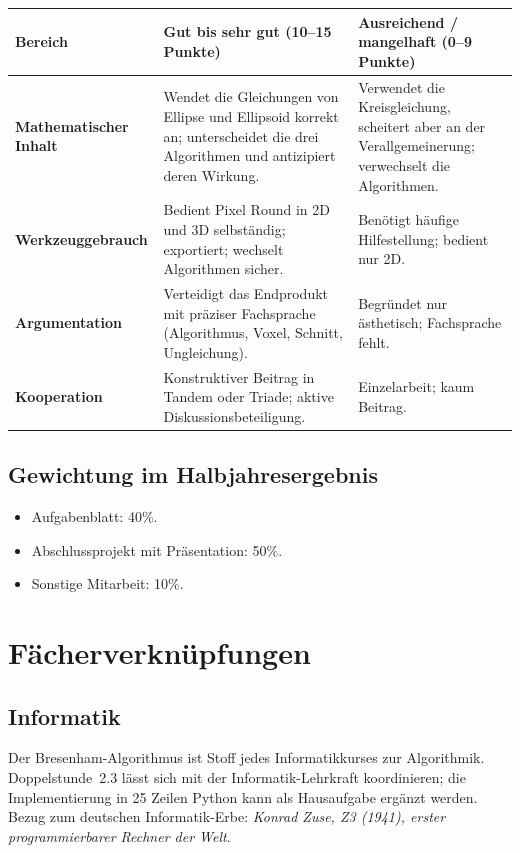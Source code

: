 \documentclass[12pt,a4paper]{scrartcl}
\begin{document}
\begin{center}
\small
\begin{tabularx}{\textwidth}{@{}p{}XX@{}}
\toprule
\textbf{Bereich} & \textbf{Gut bis sehr gut (10--15 Punkte)} & \textbf{Ausreichend / mangelhaft (0--9 Punkte)} \\
\midrule
\textbf{Mathematischer Inhalt} & Wendet die Gleichungen von Ellipse und Ellipsoid korrekt an; unterscheidet die drei Algorithmen und antizipiert deren Wirkung. & Verwendet die Kreisgleichung, scheitert aber an der Verallgemeinerung; verwechselt die Algorithmen. \\
\addlinespace[3pt]
\textbf{Werkzeuggebrauch} & Bedient Pixel Round in 2D und 3D selbständig; exportiert; wechselt Algorithmen sicher. & Benötigt häufige Hilfestellung; bedient nur 2D. \\
\addlinespace[3pt]
\textbf{Argumentation} & Verteidigt das Endprodukt mit präziser Fachsprache (Algorithmus, Voxel, Schnitt, Ungleichung). & Begründet nur ästhetisch; Fachsprache fehlt. \\
\addlinespace[3pt]
\textbf{Kooperation} & Konstruktiver Beitrag in Tandem oder Triade; aktive Diskussionsbeteiligung. & Einzelarbeit; kaum Beitrag. \\
\bottomrule
\end{tabularx}
\end{center}

\subsection{Gewichtung im Halbjahresergebnis}
\begin{itemize}[leftmargin=1.3em,itemsep=0.1em,topsep=0.2em,nosep]
  \item Aufgabenblatt: 40\%.
  \item Abschlussprojekt mit Präsentation: 50\%.
  \item Sonstige Mitarbeit: 10\%.
\end{itemize}

\section{Fächerverknüpfungen}

\subsection{Informatik}
Der Bresenham-Algorithmus ist Stoff jedes Informatikkurses zur Algorithmik. Doppelstunde~2.3 lässt sich mit der Informatik-Lehrkraft koordinieren; die Implementierung in 25 Zeilen Python kann als Hausaufgabe ergänzt werden. Bezug zum deutschen Informatik-Erbe: \emph{Konrad Zuse, Z3 (1941), erster programmierbarer Rechner der Welt}.
\end{document}
